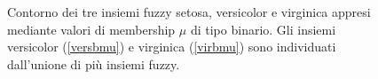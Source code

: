 \documentclass [11pt,a4paper,twoside,openright] {book}
\begin{document}
\begin{figure}[!tb]
        \centering%
        \qquad\qquad
       \qquad\qquad
          \caption{Contorno dei tre insiemi fuzzy setosa, versicolor e virginica appresi mediante valori di membership $\mu$ di tipo binario. Gli insiemi versicolor (\ref{versbmu}) e virginica (\ref{virbmu}) sono individuati dall'unione di più insiemi fuzzy.\label{bmu}}
\end{figure}
\end{document}

